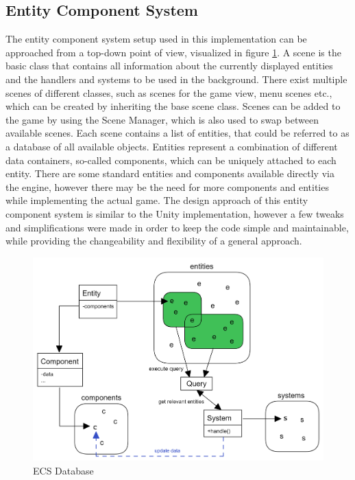 \subsection{Entity Component System}\label{subsec:entity-component-system-implementation}
The entity component system setup used in this implementation can be approached from a top-down point of view, visualized in figure \ref{fig:ecs}.
A scene is the basic class that contains all information about the currently displayed entities and the handlers and systems to be used
in the background.
There exist multiple scenes of different classes, such as scenes for the game view, menu scenes etc., which can be created by
inheriting the base scene class.
Scenes can be added to the game by using the Scene Manager, which is also used to swap between available scenes.
Each scene contains a list of entities, that could be referred to as a database of all available objects.
Entities represent a combination of different data containers, so-called components, which can be uniquely attached to each entity.
There are some standard entities and components available directly via the engine, however there may be the need for more components and entities while implementing the actual game.
The design approach of this entity component system is similar to the Unity implementation, however a few tweaks and simplifications were made in order to keep the code
simple and maintainable, while providing the changeability and flexibility of a general approach.
\begin{figure}
    \centering
    \includegraphics[width=\textwidth]{Pictures/res/implementation/ecs-database}
    \caption{ECS Database}
    \label{fig:ecs}
\end{figure}
